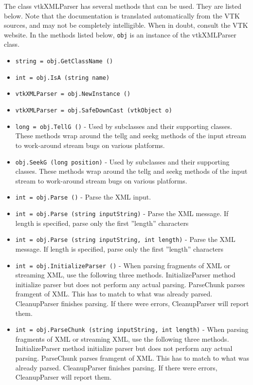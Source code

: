 The class vtkXMLParser has several methods that can be used.
  They are listed below.
Note that the documentation is translated automatically from the VTK sources,
and may not be completely intelligible.  When in doubt, consult the VTK website.
In the methods listed below, \verb|obj| is an instance of the vtkXMLParser class.
\begin{itemize}
\item  \verb|string = obj.GetClassName ()|

\item  \verb|int = obj.IsA (string name)|

\item  \verb|vtkXMLParser = obj.NewInstance ()|

\item  \verb|vtkXMLParser = obj.SafeDownCast (vtkObject o)|

\item  \verb|long = obj.TellG ()| -  Used by subclasses and their supporting classes.  These methods
 wrap around the tellg and seekg methods of the input stream to
 work-around stream bugs on various platforms.

\item  \verb|obj.SeekG (long position)| -  Used by subclasses and their supporting classes.  These methods
 wrap around the tellg and seekg methods of the input stream to
 work-around stream bugs on various platforms.

\item  \verb|int = obj.Parse ()| -  Parse the XML input.

\item  \verb|int = obj.Parse (string inputString)| -  Parse the XML message. If length is specified, parse only the
 first ''length'' characters

\item  \verb|int = obj.Parse (string inputString, int length)| -  Parse the XML message. If length is specified, parse only the
 first ''length'' characters

\item  \verb|int = obj.InitializeParser ()| -  When parsing fragments of XML or streaming XML, use the following
 three methods.  InitializeParser method initialize parser but
 does not perform any actual parsing.  ParseChunk parses framgent
 of XML. This has to match to what was already
 parsed. CleanupParser finishes parsing. If there were errors,
 CleanupParser will report them.

\item  \verb|int = obj.ParseChunk (string inputString, int length)| -  When parsing fragments of XML or streaming XML, use the following
 three methods.  InitializeParser method initialize parser but
 does not perform any actual parsing.  ParseChunk parses framgent
 of XML. This has to match to what was already
 parsed. CleanupParser finishes parsing. If there were errors,
 CleanupParser will report them.


\end{itemize}
